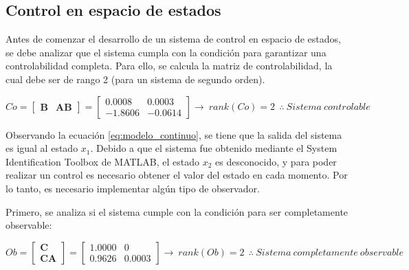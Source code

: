 \vspace{-0.5cm}
\subsection{\textbf{Control en espacio de estados}}
\vspace{-0.5cm}

Antes de comenzar el desarrollo de un sistema de control en espacio de estados, se debe analizar
que el sistema cumpla con la condición para garantizar una controlabilidad completa. Para ello,
se calcula la matriz de controlabilidad, la cual debe ser de rango 2 (para un sistema de segundo orden).

\vspace{-0.5cm}
\begin{equation}
    Co
    =
    \begin{bmatrix}
        \textbf{B} & \textbf{AB}
    \end{bmatrix}
    =
    \begin{bmatrix}
        0.0008  & 0.0003    \\
        -1.8606 & -0.0614
    \end{bmatrix}
    \rightarrow
    \
    rank(Co) = 2\            
    \
    \therefore
    \ Sistema\  controlable
\end{equation}
\vspace{-0.5cm}

Observando la ecuación \ref{eq:modelo_continuo}, se tiene que la salida del sistema es igual
al estado $x_1$. Debido a que el sistema fue obtenido mediante el System Identification Toolbox de MATLAB,
el estado $x_2$ es desconocido, y para poder realizar un control es necesario obtener el valor del 
estado en cada momento. Por lo tanto, es necesario implementar algún tipo de observador.

Primero, se analiza si el sistema cumple con la condición para ser completamente observable:

\vspace{-0.5cm}
\begin{equation}
    Ob
    =
    \begin{bmatrix}
        \textbf{C}  \\ \textbf{CA}
    \end{bmatrix}
    =
    \begin{bmatrix}
        1.0000  &    0      \\ 
        0.9626  &    0.0003
    \end{bmatrix}
    \rightarrow
    \
    rank(Ob) = 2\            
    \
    \therefore
    \ Sistema\  completamente \ observable
\end{equation}
\vspace{-0.5cm}         

